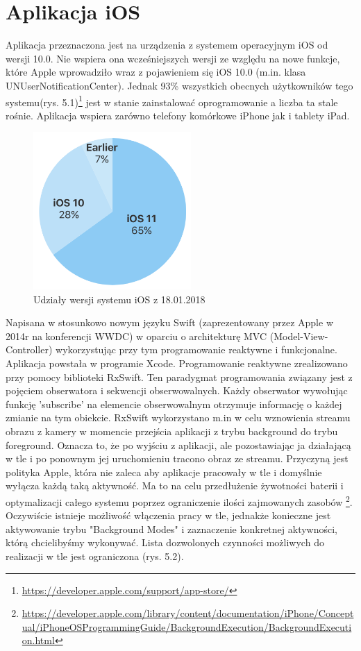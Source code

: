 \section{Aplikacja iOS}
Aplikacja przeznaczona jest na urządzenia z systemem operacyjnym iOS od wersji 10.0. 
Nie wspiera ona wcześniejszych wersji ze względu na nowe funkcje, które Apple wprowadziło wraz z pojawieniem się iOS 10.0 (m.in. klasa UNUserNotificationCenter). Jednak 93\% wszystkich obecnych użytkowników tego systemu(rys. 5.1)\footnote{\url{https://developer.apple.com/support/app-store/}} jest w stanie zainstalować oprogramowanie a liczba ta stale rośnie. Aplikacja wspiera zarówno telefony komórkowe iPhone jak i tablety iPad. 
\begin{figure}[ht]
	\centering
	\includegraphics[width=6cm]{ios_screenshots/iOSstat.png}
	\caption{Udziały wersji systemu iOS z 18.01.2018}
\end{figure}
Napisana w stosunkowo nowym języku Swift (zaprezentowany przez Apple w 2014r na konferencji WWDC) w oparciu o architekturę MVC (Model-View-Controller) wykorzystując przy tym programowanie reaktywne i funkcjonalne. Aplikacja powstała w programie Xcode. Programowanie reaktywne zrealizowano przy pomocy biblioteki RxSwift. Ten paradygmat programowania związany jest z pojęciem obserwatora i sekwencji obserwowalnych. Każdy obserwator wywołując funkcję 'subscribe' na elemencie obserwowalnym otrzymuje informację o każdej zmianie na tym obiekcie. RxSwift wykorzystano m.in w celu wznowienia streamu obrazu z kamery w momencie przejścia aplikacji z trybu background do trybu foreground. Oznacza to, że po wyjściu z aplikacji, ale pozostawiając ja działającą w tle i po ponownym jej uruchomieniu tracono obraz ze streamu. Przyczyną jest polityka Apple, która nie zaleca aby aplikacje pracowały w tle i domyślnie wyłącza każdą taką aktywność. Ma to na celu przedłużenie żywotności baterii i optymalizacji całego systemu poprzez ograniczenie ilości zajmowanych zasobów \footnote{\url{https://developer.apple.com/library/content/documentation/iPhone/Conceptual/iPhoneOSProgrammingGuide/BackgroundExecution/BackgroundExecution.html}}.  Oczywiście istnieje możliwość włączenia pracy w tle, jednakże konieczne jest aktywowanie trybu "Background Modes" i zaznaczenie konkretnej aktywności, którą chcielibyśmy wykonywać. Lista dozwolonych czynności możliwych do realizacji w tle jest ograniczona (rys. 5.2). 

